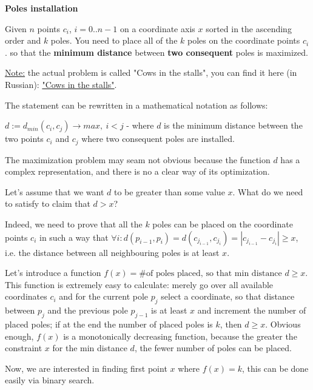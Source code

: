 
\begin{problem}\textbf{Poles installation}

    Given $n$ points $c_i$, $i=0..n-1$ on a coordinate axis $x$ sorted in the ascending order and $k$ poles. You need to place all of the $k$ poles on the coordinate points $c_i$. so that the \textbf{minimum distance} between \textbf{two consequent} poles is maximized.

    \underline{Note:} the actual problem is called "Cows in the stalls", you can find it here (in Russian): \href{https://ru.algorithmica.org/cs/interactive/answer-search/}{"Cows in the stalls"}.

\end{problem}


\begin{solution}

    The statement can be rewritten in a mathematical notation as follows:

    $d := d_{min}(c_i, c_j) \to max, \ i < j$ - where $d$ is the minimum distance between the two points $c_i$ and $c_j$ where two consequent poles are installed.

    The maximization problem may seam not obvious because the function $d$ has a complex representation, and there is no a clear way of its optimization.

    Let's assume that we want $d$ to be greater than some value $x$. What do we need to satisfy to claim that $d > x$?

    Indeed, we need to prove that all the $k$ poles can be placed on the coordinate points $c_i$ in such a way that $\forall i: d(p_{i-1}, p_{i}) = d(c_{j_{i-1}}, c_{j_i}) = |c_{j_{i-1}} - c_{j_i}| \geq x$, i.e. the distance between all neighbouring poles is at least $x$.

    Let's introduce a function $f(x) = \text{\# of poles placed, so that min distance $d \geq x$}$. This function is extremely easy to calculate: merely go over all available coordinates $c_i$ and for the current pole $p_j$ select a coordinate, so that distance between $p_j$ and the previous pole $p_{j-1}$ is at least $x$ and increment the number of placed poles; if at the end the number of placed poles is $k$, then $d \geq x$. Obvious enough, $f(x)$ is a monotonically decreasing function, because the greater the constraint $x$ for the min distance $d$, the fewer number of poles can be placed.

    Now, we are interested in finding first point $x$ where $f(x) = k$, this can be done easily via binary search.


\end{solution}



